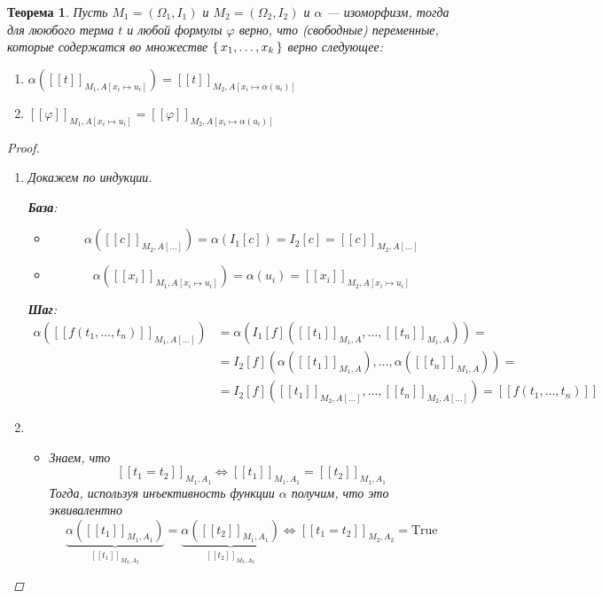 \documentclass[12pt]{article}
\theoremstyle{definition}
\theoremstyle{plain}
\newtheorem{theorem}{Теорема}[section]
\theoremstyle{remark}
\begin{document}
\begin{theorem}
  Пусть $M_1 = (\Omega_1, I_1)$ и $M_2 = (\Omega_2, I_2)$ и $\alpha$
  --- изоморфизм, тогда для лююбого терма $t$ и любой формулы
  $\varphi$ верно, что (свободные) переменные, которые содержатся во
  множестве $\set{x_1, \dots, x_k}$ верно следующее:
  \begin{enumerate}
    \item $\alpha([[t]]_{M_1, A[x_i \mapsto u_i]}) = [[t]]_{M_2,A[x_i
      \mapsto \alpha(u_i)]}$

    \item $[[\varphi]]_{M_1, A[x_i \mapsto u_i]} = [[\varphi]]_{M_2,A[x_i
      \mapsto \alpha(u_i)]}$
  \end{enumerate}
  \begin{proof}
    \begin{enumerate}
      \item
        Докажем по индукции.

        \textbf{База}:
        \begin{itemize}
          \item
            \[
              \alpha([[c]]_{M_2,A[\dots]}) = \alpha(I_1[c]) = I_2[c] =
              [[c]]_{M_2,A[\dots]}
            \]

          \item
            \[
              \alpha([[x_i]]_{M_1,A[x_i \mapsto u_i]}) = \alpha(u_i) =
              [[x_i]]_{M_2,A[x_i \mapsto u_i]}
            \]
        \end{itemize}

        \textbf{Шаг}:
        \begin{align*}
          \alpha([[f(t_1, \dots, t_n)]]_{M_1,A[\dots]}) &=
          \alpha(I_1[f]([[t_1]]_{M_1,A}, \dots, [[t_n]]_{M_1,A})) =\\&=
          I_2[f](\alpha([[t_1]]_{M_1,A}), \dots, \alpha([[t_n]]_{M_1,A})) =\\&=
          I_2[f]([[t_1]]_{M_2,A[\dots]}, \dots, [[t_n]]_{M_2,A[\dots]}) =
          [[f(t_1, \dots, t_n)]]
        \end{align*}

      \item
        \begin{itemize}
          \item  Знаем, что
            \[
              [[t_1 = t_2]]_{M_1,A_1} \iff [[t_1]]_{M_1,A_1} = [[t_2]]_{M_1,A_1}
            \]
            Тогда, используя инъективность функции $\alpha$ получим, что
            это эквивалентно
            \[
              \underbrace{\alpha([[t_1]]_{M_1,A_1})}_{[[t_1]]_{M_2,A_2}}
              =
              \underbrace{\alpha([[t_2]]_{M_1,A_1})}_{[[t_2]]_{M_2,A_2}}
              \iff [[t_1 = t_2]]_{M_2,A_2} = \mathrm{True}
            \]


\end{itemize}
\end{enumerate}
\end{proof}
\end{theorem}
\end{document}
